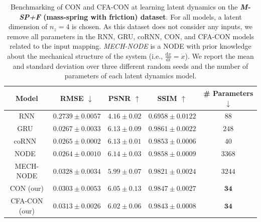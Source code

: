 \begin{table}[ht]
    \centering
    \begin{small}
    \begin{tabular}{c c c c c}
         \toprule
         \textbf{Model} & \textbf{RMSE} $\downarrow$ & \textbf{PSNR} $\uparrow$ & \textbf{SSIM} $\uparrow$ & \textbf{\# Parameters} $\downarrow$ \\
         \midrule
         RNN & $0.2739 \pm 0.0057$ & $4.16 \pm 0.02$ & $0.6958 \pm 0.0122$ & $88$\\
         GRU~\citep{cho2014learning} & $0.0267 \pm 0.0033$ & $\mathbf{6.13 \pm 0.09}$ & $0.9861 \pm 0.0022$ & $248$\\
         coRNN~\citep{rusch2020coupled} & $\mathbf{0.0265 \pm 0.0002}$ & $\mathbf{6.13 \pm 0.01}$ & $\mathbf{0.9853 \pm 0.0006}$ & $40$\\
         NODE~\citep{chen2018neural} & $\mathbf{0.0264 \pm 0.0010}$ & $\mathbf{6.14 \pm 0.03}$ & $\mathbf{0.9858 \pm 0.0009}$ & $3368$\\
         MECH-NODE & $0.0328 \pm 0.0034$ & $5.99 \pm 0.07$ & $0.9821 \pm 0.0024$ & $3244$\\
         CON (our) & $0.0303 \pm 0.0053$ & $6.05 \pm 0.13$ & $0.9847 \pm 0.0027$ & $\mathbf{34}$\\
         CFA-CON (our) & $0.0313 \pm 0.0026$ & $6.02 \pm 0.06$ & $0.9843 \pm 0.0008$ & $\mathbf{34}$\\
         \bottomrule
    \end{tabular}
    \end{small}
    \vspace{0.5cm}
    \caption{Benchmarking of \gls{CON} and \gls{CFA-CON} at learning latent dynamics on the \textbf{\emph{M-SP+F} (mass-spring with friction) dataset}. For all models, a latent dimension of $n_z=4$ is chosen.
    As this dataset does not consider any inputs, we remove all parameters in the RNN, GRU, coRNN, CON, and CFA-CON models related to the input mapping.
    \emph{MECH-NODE} is a \gls{NODE} with prior knowledge about the mechanical structure of the system (i.e., $\frac{\mathrm{d}x}{\mathrm{d}t} = \dot{x}$). We report the mean and standard deviation over three different random seeds and the number of parameters of each latent dynamics model.
    }
    \label{tab:apx-con:latent_dynamics_results:m_sp_f}
\end{table}

